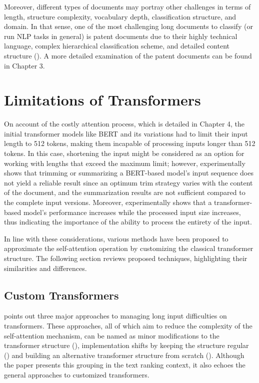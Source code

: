 \documentclass{iyte}
\begin{document}
Moreover, different types of documents may portray other challenges in terms of length, structure complexity, vocabulary depth, classification structure, and domain. In that sense, one of the most challenging long documents to classify (or run NLP tasks in general) is patent documents due to their highly technical language, complex hierarchical classification scheme, and detailed content structure (\citealt{patent_classification_book_survey}). A more detailed examination of the patent documents can be found in Chapter 3.

\section{Limitations of Transformers}

On account of the costly attention process, which is detailed in Chapter 4, the initial transformer models like BERT and its variations had to limit their input length to 512 tokens, making them incapable of processing inputs longer than 512 tokens. In this case, shortening the input might be considered as an option for working with lengths that exceed the maximum limit; however, \citet{shortening_for_bert} experimentally shows that trimming or summarizing a BERT-based model's input sequence does not yield a reliable result since an optimum trim strategy varies with the content of the document, and the summarization results are not sufficient compared to the complete input versions. Moreover, \citet{beyond_512} experimentally shows that a transformer-based model's performance increases while the processed input size increases, thus indicating the importance of the ability to process the entirety of the input.

In line with these considerations, various methods have been proposed to approximate the self-attention operation by customizing the classical transformer structure. The following section reviews proposed techniques, highlighting their similarities and differences.

\subsection{Custom Transformers}

\citet{bert_and_beyond} points out three major approaches to managing long input difficulties on transformers. These approaches, all of which aim to reduce the complexity of the self-attention mechanism, can be named as minor modifications to the transformer structure (\citealt{blockwise}), implementation shifts by keeping the structure regular (\citealt{compress_attention}) and building an alternative transformer structure from scratch (\citealt{evolved_transformer}). Although the paper presents this grouping in the text ranking context, it also echoes the general approaches to customized transformers.
\end{document}
